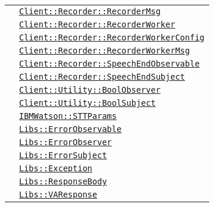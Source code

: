 \begin{longtable}{|>{\centering}m{3cm}|m{10cm}<{\centering}|}
& \hyperref[Client::Recorder::RecorderMsg]{\texttt{Client::Recorder::RecorderMsg}}\\
& \hyperref[Client::Recorder::RecorderWorker]{\texttt{Client::Recorder::RecorderWorker}}\\
& \hyperref[Client::Recorder::RecorderWorkerConfig]{\texttt{Client::Recorder::RecorderWorkerConfig}}\\
& \hyperref[Client::Recorder::RecorderWorkerMsg]{\texttt{Client::Recorder::RecorderWorkerMsg}}\\
& \hyperref[Client::Recorder::SpeechEndObservable]{\texttt{Client::Recorder::SpeechEndObservable}}\\
& \hyperref[Client::Recorder::SpeechEndSubject]{\texttt{Client::Recorder::SpeechEndSubject}}\\
& \hyperref[Client::Utility::BoolObserver]{\texttt{Client::Utility::BoolObserver}}\\
& \hyperref[Client::Utility::BoolSubject]{\texttt{Client::Utility::BoolSubject}}\\
& \hyperref[IBMWatson::STTParams]{\texttt{IBMWatson::STTParams}}\\
& \hyperref[Libs::ErrorObservable]{\texttt{Libs::ErrorObservable}}\\
& \hyperref[Libs::ErrorObserver]{\texttt{Libs::ErrorObserver}}\\
& \hyperref[Libs::ErrorSubject]{\texttt{Libs::ErrorSubject}}\\
& \hyperref[Libs::Exception]{\texttt{Libs::Exception}}\\
& \hyperref[Libs::ResponseBody]{\texttt{Libs::ResponseBody}}\\
& \hyperref[Libs::VAResponse]{\texttt{Libs::VAResponse}}\\ \hline


\end{longtable}
